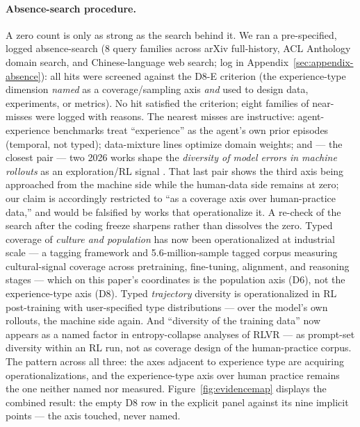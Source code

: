 \documentclass[10pt]{article}
\begin{document}
\paragraph{Absence-search procedure.}
A zero count is only as strong as the search behind it. We ran a pre-specified, logged absence-search (8 query families across arXiv full-history, ACL Anthology domain search, and Chinese-language web search; log in Appendix~\ref{sec:appendix-absence}): all hits were screened against the D8-E criterion (the experience-type dimension \emph{named} as a coverage/sampling axis \emph{and} used to design data, experiments, or metrics). No hit satisfied the criterion; eight families of near-misses were logged with reasons. The nearest misses are instructive: agent-experience benchmarks treat ``experience'' as the agent's own prior episodes (temporal, not typed); data-mixture lines optimize domain weights; and --- the closest pair --- two 2026 works shape the \emph{diversity of model errors in machine rollouts} as an exploration/RL signal \cite{baek2026dfuser, liu2026leveraging}. That last pair shows the third axis being approached from the machine side while the human-data side remains at zero; our claim is accordingly restricted to ``as a coverage axis over human-practice data,'' and would be falsified by works that operationalize it. A re-check of the search after the coding freeze sharpens rather than dissolves the zero. Typed coverage of \emph{culture and population} has now been operationalized at industrial scale --- a tagging framework and 5.6-million-sample tagged corpus measuring cultural-signal coverage across pretraining, fine-tuning, alignment, and reasoning stages \cite{sahu2026culturefunnel} --- which on this paper's coordinates is the population axis (D6), not the experience-type axis (D8). Typed \emph{trajectory} diversity is operationalized in RL post-training with user-specified type distributions \cite{fu2026tjpo} --- over the model's own rollouts, the machine side again. And ``diversity of the training data'' now appears as a named factor in entropy-collapse analyses of RLVR \cite{jin2025entropy} --- as prompt-set diversity within an RL run, not as coverage design of the human-practice corpus. The pattern across all three: the axes adjacent to experience type are acquiring operationalizations, and the experience-type axis over human practice remains the one neither named nor measured. Figure~\ref{fig:evidencemap} displays the combined result: the empty D8 row in the explicit panel against its nine implicit points --- the axis touched, never named.
\end{document}
